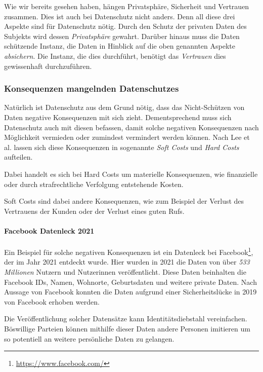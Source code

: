 Wie wir bereits gesehen haben, hängen Privatsphäre, Sicherheit und Vertrauen zusammen. 
Dies ist auch bei Datenschutz nicht anders. Denn all diese drei Aspekte sind für Datenschutz nötig.
Durch den Schutz der privaten Daten des Subjekts wird dessen \emph{Privatsphäre} gewahrt.
Darüber hinaus muss die Daten schützende Instanz, die Daten in Hinblick auf die oben genannten Aspekte \emph{absichern}.
Die Instanz, die dies durchführt, benötigt das \emph{Vertrauen} dies gewissenhaft durchzuführen.

\subsubsection{Konsequenzen mangelnden Datenschutzes}

Natürlich ist Datenschutz aus dem Grund nötig, dass das Nicht-Schützen von Daten negative Konsequenzen mit sich zieht.
Dementsprechend muss sich Datenschutz auch mit diesen befassen, damit solche negativen Konsequenzen nach Möglichkeit vermieden oder zumindest vermindert werden können.
Nach Lee et al. lassen sich diese Konsequenzen in sogenannte \emph{Soft Costs} und \emph{Hard Costs} aufteilen. \cite{lee_ethical_2016}

Dabei handelt es sich bei Hard Costs um materielle Konsequenzen, wie finanzielle oder durch strafrechtliche Verfolgung entstehende Kosten.

Soft Costs sind dabei andere Konsequenzen, wie zum Beispiel der Verlust des Vertrauens der Kunden oder der Verlust eines guten Rufs.

\paragraph*{Facebook Datenleck 2021}

Ein Beispiel für solche negativen Konsequenzen ist ein Datenleck bei Facebook\footnote{\url{https://www.facebook.com/}}, 
der im Jahr 2021 entdeckt wurde. \cite{holmes_533_2021}
Hier wurden in 2021 die Daten von über \emph{533 Millionen} Nutzern und Nutzerinnen veröffentlicht.
Diese Daten beinhalten die Facebook IDs, Namen, Wohnorte, Geburtsdaten und weitere private Daten.
Nach Aussage von Facebook konnten die Daten aufgrund einer Sicherheitslücke in 2019 von Facebook erhoben werden. \cite{clark_facts_2021}

Die Veröffentlichung solcher Datensätze kann Identitätsdiebstahl vereinfachen.
Böswillige Parteien können mithilfe dieser Daten andere Personen imitieren um so potentiell an weitere persönliche Daten zu gelangen.

